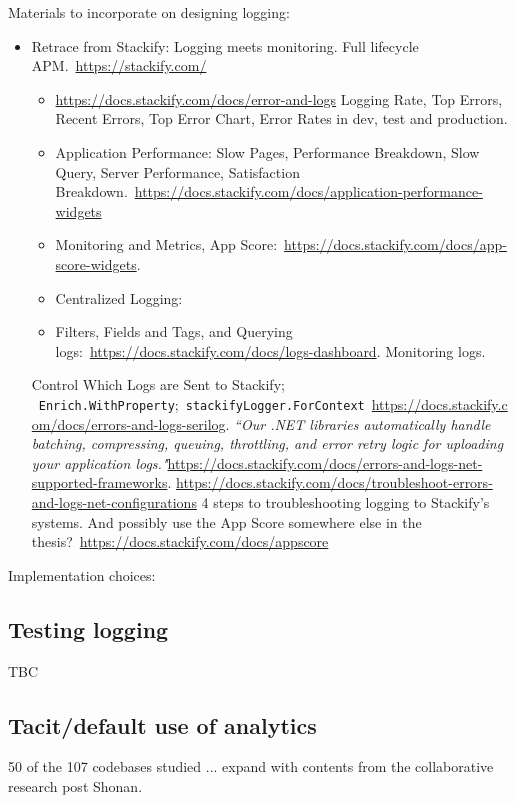 Materials to incorporate on designing logging:
\begin{itemize}
    \item Retrace from Stackify: Logging meets monitoring. Full lifecycle APM.~\url{https://stackify.com/}
    \begin{itemize}
        \item \url{https://docs.stackify.com/docs/error-and-logs} Logging Rate, Top Errors, Recent Errors, Top Error Chart, Error Rates in dev, test and production.
        \item Application Performance: Slow Pages, Performance Breakdown, Slow Query, Server Performance, Satisfaction Breakdown.~\url{https://docs.stackify.com/docs/application-performance-widgets}
        \item Monitoring and Metrics, App Score:~\url{https://docs.stackify.com/docs/app-score-widgets}.
        \item Centralized Logging: 
        \item Filters, Fields and Tags, and Querying logs:~\url{https://docs.stackify.com/docs/logs-dashboard}. Monitoring logs. 
    \end{itemize}Control Which Logs are Sent to Stackify; ~\texttt{Enrich.WithProperty};~\texttt{stackifyLogger.ForContext}~\url{https://docs.stackify.com/docs/errors-and-logs-serilog}. \emph{``Our .NET libraries automatically handle batching, compressing, queuing, throttling, and error retry logic for uploading your application logs."}\url{https://docs.stackify.com/docs/errors-and-logs-net-supported-frameworks}. \url{https://docs.stackify.com/docs/troubleshoot-errors-and-logs-net-configurations} 4 steps to troubleshooting logging to Stackify's systems. And possibly use the App Score somewhere else in the thesis?~\url{https://docs.stackify.com/docs/appscore}
\end{itemize}

Implementation choices: 

\subsection{Testing logging}
TBC

\subsection{Tacit/default use of analytics}
50 of the 107 codebases studied ... expand with contents from the collaborative research post Shonan.

